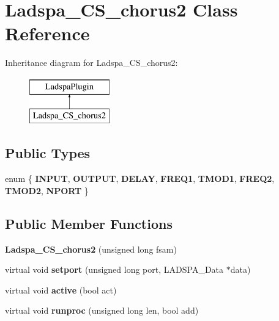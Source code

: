\hypertarget{class_ladspa___c_s__chorus2}{}\section{Ladspa\+\_\+\+C\+S\+\_\+chorus2 Class Reference}
\label{class_ladspa___c_s__chorus2}
Inheritance diagram for Ladspa\+\_\+\+C\+S\+\_\+chorus2\+:\begin{figure}[H]
\begin{center}
\leavevmode
\includegraphics[height=2.000000cm]{class_ladspa___c_s__chorus2}
\end{center}
\end{figure}
\subsection*{Public Types}
\begin{DoxyCompactItemize}
\item 
\mbox{\label{class_ladspa___c_s__chorus2_a367af539982cff94b8c84348b28f5e6b}} 
enum \{ \newline
{\bfseries I\+N\+P\+UT}, 
{\bfseries O\+U\+T\+P\+UT}, 
{\bfseries D\+E\+L\+AY}, 
{\bfseries F\+R\+E\+Q1}, 
\newline
{\bfseries T\+M\+O\+D1}, 
{\bfseries F\+R\+E\+Q2}, 
{\bfseries T\+M\+O\+D2}, 
{\bfseries N\+P\+O\+RT}
 \}
\end{DoxyCompactItemize}
\subsection*{Public Member Functions}
\begin{DoxyCompactItemize}
\item 
\mbox{\label{class_ladspa___c_s__chorus2_a6c5c49d3770d87834e1683de73b5835c}} 
{\bfseries Ladspa\+\_\+\+C\+S\+\_\+chorus2} (unsigned long fsam)
\item 
\mbox{\label{class_ladspa___c_s__chorus2_a87da7301755dae489ecefa9179151b35}} 
virtual void {\bfseries setport} (unsigned long port, L\+A\+D\+S\+P\+A\+\_\+\+Data $\ast$data)
\item 
\mbox{\label{class_ladspa___c_s__chorus2_adf7b954ad9181186cd3edebb42ebaf95}} 
virtual void {\bfseries active} (bool act)
\item 
\mbox{\label{class_ladspa___c_s__chorus2_a6d24a20d8e1c2e0ca4b92f2da83c9d28}} 
virtual void {\bfseries runproc} (unsigned long len, bool add)
\end{DoxyCompactItemize}


